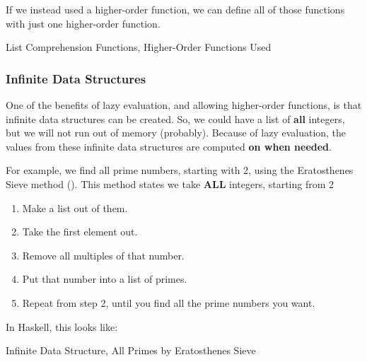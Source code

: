 If we instead used a higher-order function, we can define all of those functions with just one higher-order function.
\begin{listing}[h!tbp]
\caption{List Comprehension Functions, Higher-Order Functions Used}
\label{lst:Many_Funcs_Higher_Order}
\end{listing}

\subsubsection{Infinite Data Structures}\label{subsubsec:Infinite_Data_Structures}
One of the benefits of lazy evaluation, and allowing higher-order functions, is that infinite data structures can be created.
So, we could have a list of \textbf{all} integers, but we will not run out of memory (probably).
Because of lazy evaluation, the values from these infinite data structures are computed \textbf{on when needed}.

For example, we find all prime numbers, starting with 2, using the Eratosthenes Sieve method ().
This method states we take \textbf{ALL} integers, starting from 2
\begin{enumerate}[noitemsep]
\item Make a list out of them.
\item Take the first element out.
\item Remove all multiples of that number.
\item Put that number into a list of primes.
\item Repeat from step 2, until you find all the prime numbers you want.
\end{enumerate}

In Haskell, this looks like:
\begin{listing}[h!tbp]
\caption{Infinite Data Structure, All Primes by Eratosthenes Sieve}
\label{lst:Infinite_Data_Structure}
\end{listing}

